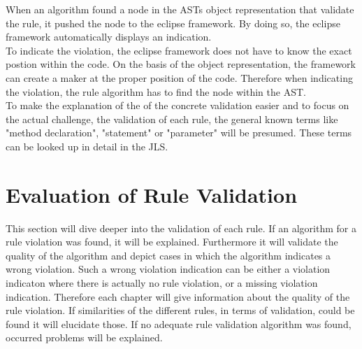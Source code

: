 When an algorithm found a node in the \acf{AST}s object representation that validate the rule, it pushed the node to the eclipse framework. By doing so, the eclipse framework automatically displays an indication. 
\\

To indicate the violation, the eclipse framework does not have to know the exact postion within the code. On the basis of the object representation, the framework can create a maker at the proper position of the code. Therefore when indicating the violation, the rule algorithm has to find the node within the \acf{AST}.
\\

To make the explanation of the of the concrete validation easier and to focus on the actual challenge, the validation of each rule, the general known terms like "method declaration", "statement" or "parameter" will be presumed. These terms can be looked up in detail in the \acf{JLS}\cite{jls}. 

\section{Evaluation of Rule Validation}
\label{e:evaluation}
This section will dive deeper into the validation of each rule. If an algorithm for a rule violation was found, it will be explained. Furthermore it will validate the quality of the algorithm and depict cases in which the algorithm indicates a wrong violation. Such a wrong violation indication can be either a violation indicaton where there is actually no rule violation, or a missing violation indication. Therefore each chapter will give information about the quality of the rule violation. If similarities of the different rules, in terms of validation, could be found it will elucidate those.
If no adequate rule validation algorithm was found, occurred problems will be explained.


  
 
